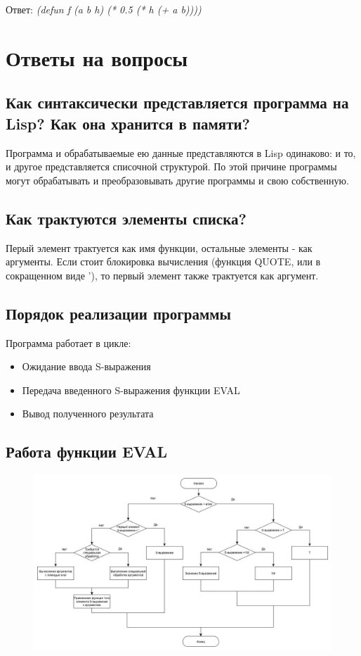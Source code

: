 \documentclass[a4paper,12pt]{article}
\begin{document}
	Ответ: \textit{(defun f (a b h) (* 0.5 (* h (+ a b))))}
	
	\newpage
	
	\section*{Ответы на вопросы}
	
	\subsection*{Как синтаксически представляется программа на Lisp? Как она хранится в памяти?}
	
	Программа и обрабатываемые ею данные представляются в Lisp одинаково:
	и то, и другое представляется списочной структурой. По этой причине программы могут обрабатывать и преобразовывать другие программы и свою собственную.
	
	\subsection*{Как трактуются элементы списка?}
	
	Перый элемент трактуется как имя функции, остальные элементы - как аргументы. Если стоит блокировка вычисления (функция QUOTE, или в сокращенном виде '), то первый элемент также трактуется как аргумент.
	
	\subsection*{Порядок реализации программы}
	
	Программа работает в цикле:
	\begin{itemize}
		\item Ожидание ввода S-выражения
		\item Передача введенного S-выражения функции EVAL
		\item Вывод полученного результата
	\end{itemize}
	 \newpage
	\subsection*{Работа функции EVAL}
	
	\begin{figure}[h!]
		\begin{center}
			{\includegraphics[scale = 0.4]{eval.jpg}}
			\label{eval}
		\end{center}
	\end{figure}
\end{document}
